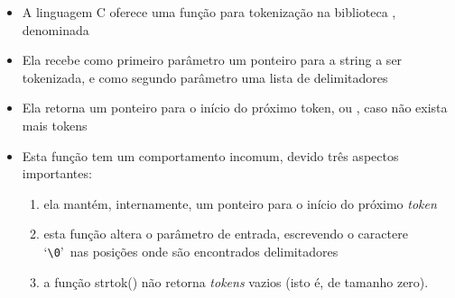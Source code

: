 \begin{frame}[fragile]{}

    \begin{itemize}
        \item A linguagem C oferece uma função para tokenização na biblioteca , 
            denominada 

        \item Ela recebe como primeiro parâmetro um ponteiro para a string a ser tokenizada, e como 
            segundo parâmetro uma lista de delimitadores

        \item Ela retorna um ponteiro para o início do próximo token, ou , caso não 
            exista mais tokens

        \item Esta função tem um comportamento incomum, devido três aspectos importantes:
            \begin{enumerate}
                \item ela mantém, internamente, um ponteiro para o início do próximo \textit{token}
                \item esta função altera o parâmetro de entrada, escrevendo o caractere \lq\verb|\0|\rq\ nas posições onde são encontrados delimitadores
                \item a função strtok() não retorna \textit{tokens} vazios 
                    (isto é, de tamanho zero).
            \end{enumerate}
    \end{itemize}

\end{frame}

